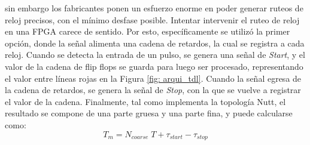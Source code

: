sin embargo los fabricantes ponen un esfuerzo enorme en poder generar ruteos
de reloj precisos, con el mínimo desfase posible. Intentar intervenir el ruteo de reloj en una FPGA
carece de sentido. Por esto, específicamente se utilizó la primer opción, donde la señal alimenta una cadena de retardos, la cual se 
registra a cada reloj. Cuando se detecta la entrada de un pulso, se genera una señal de \textit{Start}, y
el valor de la cadena de flip flops se guarda para luego ser procesado, representando el valor entre líneas
rojas en la Figura \ref{fig: arqui_tdl}. Cuando la señal egresa de la cadena de retardos, se genera la señal
de \textit{Stop}, con la que se vuelve a registrar el valor de la cadena. Finalmente, tal como implementa la
topología Nutt, el resultado se compone de una parte gruesa y una parte fina, y puede calcularse como:
\begin{equation*}
     T_{m} = N_{coarse} \; T + \tau_{start} - \tau_{stop}
\end{equation*}

